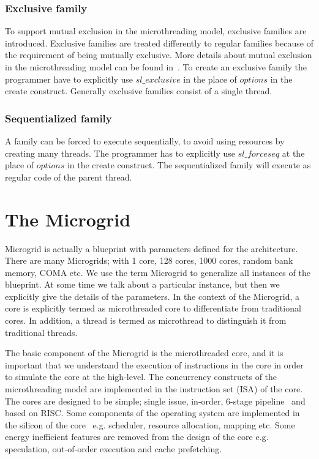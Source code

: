\documentclass{article}
\begin{document}
\subsubsection*{Exclusive family}

To support mutual exclusion in the microthreading model, exclusive families are
introduced. Exclusive families are treated differently to regular families
because of the requirement of being mutually exclusive. More details about
mutual exclusion in the microthreading model can be found
in~\cite[Sec.~14.1]{poss.12}. To create an exclusive family the programmer have
to explicitly use $sl\_exclusive$ in the place of $options$ in the create construct.
Generally exclusive families consist of a single thread.

\subsubsection*{Sequentialized family}

A family can be forced to execute sequentially, to avoid using resources by
creating many threads. The programmer has to explicitly use $sl\_forceseq$
at the place of $options$ in the create construct. The sequentialized family will
execute as regular code of the parent thread.

\section{The Microgrid} \label{sn:microgrid}

Microgrid is actually a blueprint with parameters defined for the architecture.
There are many Microgrids; with 1 core, 128 cores, 1000 cores, random bank
memory, COMA etc. We use the term Microgrid to generalize all instances of the
blueprint. At some time we talk about a particular instance, but then we
explicitly give the details of the parameters. In the context of the Microgrid,
a core is explicitly termed as microthreaded core to differentiate from
traditional cores. In addition, a thread is termed as microthread to
distinguish it from traditional threads. 

The basic component of the Microgrid is the microthreaded core, and it is
important that we understand the execution of instructions in the core in order
to simulate the core at the high-level. The concurrency constructs of the
microthreading model are implemented in the instruction set (ISA) of the core.
The cores are designed to be simple; single issue, in-order, 6-stage
pipeline~\cite{Jesshope03} and based on RISC. Some components of the operating
system are implemented in the silicon of the
core~\cite{Cotofana:1998:DCI:945405.938236} e.g. scheduler, resource
allocation, mapping etc. Some energy inefficient features are removed from the
design of the core e.g. speculation, out-of-order execution and cache
prefetching. 
\end{document}
